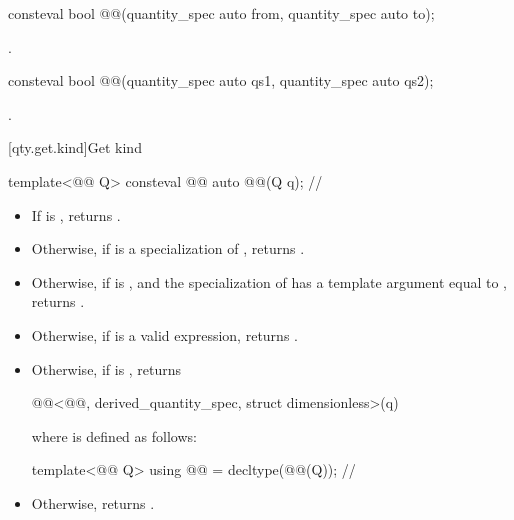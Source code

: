 \begin{itemdecl}
consteval bool @@(quantity_spec auto from, quantity_spec auto to);
\end{itemdecl}

\begin{itemdescr}
\pnum
\returns
{}.
\end{itemdescr}

\begin{itemdecl}
consteval bool @@(quantity_spec auto qs1, quantity_spec auto qs2);
\end{itemdecl}

\begin{itemdescr}
\pnum
\returns
{}.
\end{itemdescr}

[qty.get.kind]{Get kind}

\begin{itemdecl}
template<@@ Q>
consteval @@ auto @@(Q q);  // \expos
\end{itemdecl}

\begin{itemdescr}
\pnum
\returns
\begin{itemize}
\item
If  is ,
returns .
\item
Otherwise, if  is a specialization of ,
returns .
\item
Otherwise, if
is , and
the specialization of  has a template argument equal to ,
returns .
\item
Otherwise, if  is a valid expression,
returns .
\item
Otherwise, if  is ,
returns
\begin{codeblock}
@@<@@, derived_quantity_spec, struct dimensionless>(q)
\end{codeblock}
where  is defined as follows:
\begin{codeblock}
template<@@ Q>
using @@ = decltype(@@(Q{}));  // \expos
\end{codeblock}
\item
Otherwise, returns .
\end{itemize}
\end{itemdescr}

